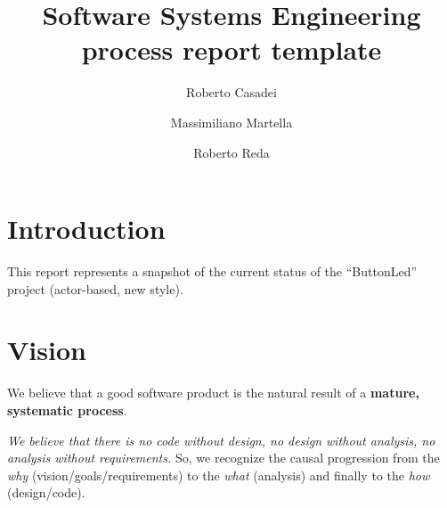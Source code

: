 \documentclass{article}
\newcommand{\labelsec}[1]{\label{sec:#1}}
\newcommand{\xauthA}{Roberto Casadei }
\newcommand{\xauthB}{Massimiliano Martella}
\newcommand{\xauthC}{Roberto Reda}
\newcommand{\xunibo}{Alma Mater Studiorum -- University of Bologna}
\newcommand{\xaddrCE}{via Venezia 52}
\newcommand{\xcityCE}{47023 Cesena, Italy}
\newcommand{\mycolor}{myrgb}
\newcommand{\colorize}[1]{{\color{\mycolor}#1}}
\begin{document}
\title{Software Systems Engineering\\
 process report template}

\author{\xauthA \and \xauthB \and \xauthC}



\maketitle



\section{Introduction}
\labelsec{intro}

 This report represents a snapshot of the current status 
  of the ``ButtonLed'' project (\colorize{actor-based, new style}).

\section{Vision}
\labelsec{Vision}

We believe that a good software product is the natural result of a
\textbf{mature, systematic process}.

\emph{We believe that there is no code without design, no design without
analysis, no analysis without requirements.} So, we recognize the causal
progression from the \emph{why} (vision/goals/requirements) to the \emph{what}
(analysis) and finally to the \emph{how} (design/code).
\end{document}
